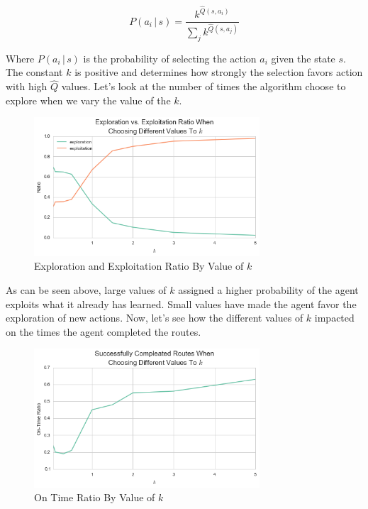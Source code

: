 \documentclass[a4paper]{article}
\begin{document}
$$P(a_i\, | \,s ) = \frac{k ^{\hat{Q}(s, a_i)}}{\sum_j k^{\hat{Q}(s, a_j)}}$$

Where $P(a_i\, | \,s )$ is the probability of selecting the action $a_i$ given the state $s$. The constant $k$ is positive and determines how strongly the selection favors action with high $\hat{Q}$ values. Let's look at the number of times the algorithm choose to explore when we vary the value of the $k$.

\begin{figure}[ht!]
\centering
\includegraphics[width=0.75\textwidth]{images/exploint_explore.png}
\caption{\label{fig:exploint_explore}Exploration and Exploitation Ratio By Value of $k$}
\end{figure}

As can be seen above, large values of $k$ assigned a higher probability of the agent exploits what it already has learned. Small values have made the agent favor the exploration of new actions. Now, let's see how the different values of $k$ impacted on the times the agent completed the routes.

\begin{figure}[ht!]
\centering
\includegraphics[width=0.75\textwidth]{images/success_runs.png}
\caption{\label{fig:success_runs}On Time Ratio By Value of $k$}
\end{figure}
\end{document}
